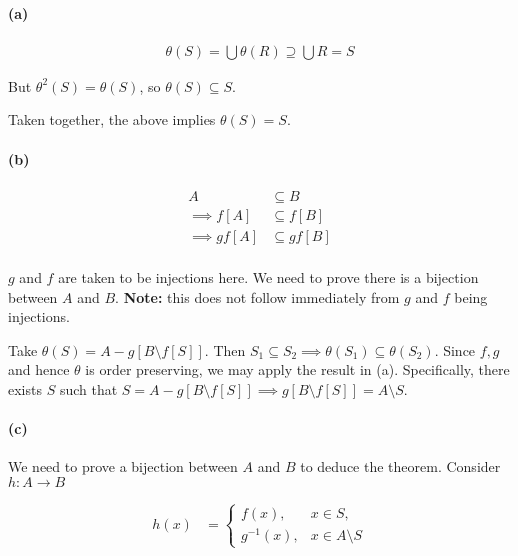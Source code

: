 \documentclass{article}
\begin{document}
\paragraph{(a)}

\begin{align*}
  \theta(S) = \bigcup \theta(R) \supseteq \bigcup R = S
\end{align*}

But $\theta^2(S) = \theta(S)$, so $\theta(S) \subseteq S$.

Taken together, the above implies $\theta(S) = S$.

\paragraph{(b)}
\begin{align*}
  A &\subseteq B \\
  \implies f\left[A\right] &\subseteq f\left[B\right] \\
  \implies gf\left[A\right] &\subseteq gf\left[B\right] \\
\end{align*}

$g$ and $f$ are taken to be injections here. We need to prove there is a bijection between $A$ and $B$. \textbf{Note:} this does not follow immediately from $g$
and $f$ being injections.

Take $\theta(S) = A - g\left[B \setminus f\left[S\right]\right]$. Then $S_1 \subseteq S_2 \implies \theta(S_1) \subseteq \theta(S_2)$. Since $f, g$ and hence $\theta$ is order preserving, we may apply the result in (a). Specifically, there exists $S$ such that $S = A - g\left[B \setminus f\left[S\right]\right] \implies g\left[B \setminus f\left[S\right]\right] = A \setminus S$.

\paragraph{(c)}

We need to prove a bijection between $A$ and $B$ to deduce the theorem. Consider $h\colon A \rightarrow B$

\begin{align*}
  h(x) &= \begin{cases}
    f(x), & x \in S,  \\
    g^{-1}(x), & x \in A \setminus S
  \end{cases} \\
\end{align*}
\end{document}
